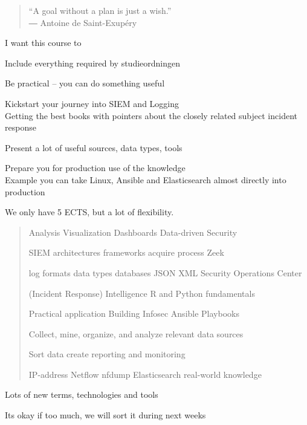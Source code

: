 \documentclass[Screen16to9,17pt]{foils}
\begin{document}


\begin{quote}
  “A goal without a plan is just a wish.”\\
  ― Antoine de Saint-Exupéry
\end{quote}

I want this course to
\begin{list2}
\item Include everything required by studieordningen
\item Be practical -- you can do something useful
\item Kickstart your journey into SIEM and Logging\\
Getting the best books with pointers about the closely related subject incident response
\item Present a lot of useful sources, data types, tools
\item Prepare you for production use of the knowledge\\
Example you can take Linux, Ansible and Elasticsearch almost directly into production
\end{list2}

We only have 5 ECTS, but a lot of flexibility.




\begin{quote}\large
Analysis Visualization Dashboards Data-driven Security

SIEM architectures frameworks acquire process Zeek

log formats data types databases JSON XML Security Operations Center

(Incident Response) Intelligence R and Python fundamentals

Practical application Building Infosec \hskip 1cm Ansible Playbooks

Collect, mine, organize, and analyze relevant data sources

Sort data create reporting and monitoring

IP-address Netflow nfdump Elasticsearch real-world knowledge
\end{quote}

\begin{list2}
\item Lots of new terms, technologies and tools
\item Its okay if too much, we will sort it during next weeks
\end{list2}
\end{document}

